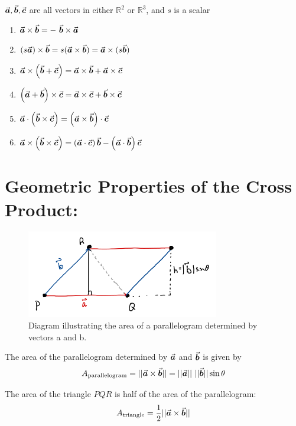 \(\a, \b, \c\) are all vectors in either \(\mathbb{R}^2\) or \(\mathbb{R}^3\), and \(s\) is a scalar 
\begin{enumerate}
\item \(\a \times \b = -\ \b \times \a\)
\item \((s\a) \times \b =s(\a \times \b) = \a \times (s\b)\)
\item \(\a \times \left(\b +\c\right) = \a \times \b + \a \times \c\)
\item \(\left(\a +\b\right) \times \c = \a \times \c + \b \times \c\)
\item \( \a \cdot \left(\b \times \c\right) = \left( \a \times \b\right) \cdot \c\)
\item \( \a \times \left(\b \times \c\right) = \left( \a \cdot \c\right) \b - \left(\a  \cdot \b\right) \c\)
\end{enumerate}

\vspace*{.1in}

\section*{Geometric Properties of the Cross Product:}





\begin{figure}[!h]
\centering
\includegraphics[height=1.5in]{Ch2s4-area-parallelogram.png}
\caption{Diagram illustrating the area of a parallelogram determined by vectors a and b.}
\end{figure}

\hspace*{.2in}

 The area of the parallelogram determined by \(\a\) and \(\b\) is given by
 \[A_{\text{parallelogram}} =||\a \times \b|| =||\a||\ ||\b|| \sin\theta\]

The area of the triangle \(PQR\) is half of the area of the parallelogram:
 \[A_{\text{triangle}} = \frac{1}{2}||\a \times \b||\]
 
